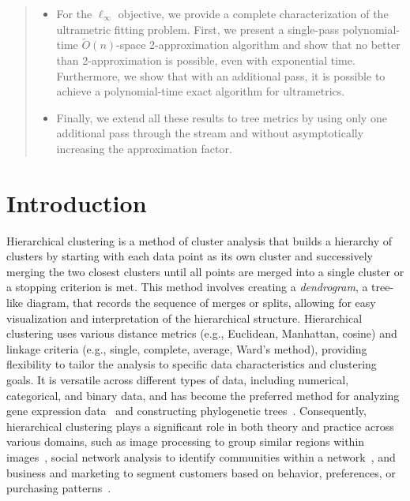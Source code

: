 \documentclass{article}
\begin{document}
\begin{abstract}
\begin{itemize}
    \item For the $\ell_\infty$ objective, we provide a complete characterization of the ultrametric fitting problem. First, we present a single-pass polynomial-time $\tilde{O}(n)$-space 2-approximation algorithm and show that no better than 2-approximation is possible, even with exponential time. Furthermore, we show that with an additional pass, it is possible to achieve a polynomial-time exact algorithm for ultrametrics.
    
    \item Finally, we extend all these results to tree metrics by using only one additional pass through the stream and without asymptotically increasing the approximation factor.

\end{itemize}

\end{abstract}

\newpage {}
\newcommand{\abs}[1]{\left|#1\right|}
\newcommand{\agreements}[1]{A(#1)}
\newcommand{\opttree}{\mathcal{T}_{ALG}}
\newcommand{\close}{\texttt{close}}


\section{Introduction} 
Hierarchical clustering is a method of cluster analysis that builds a hierarchy of clusters by starting with each data point as its own cluster and successively merging the two closest clusters until all points are merged into a single cluster or a stopping criterion is met. This method involves creating a \emph{dendrogram}, a tree-like diagram, that records the sequence of merges or splits, allowing for easy visualization and interpretation of the hierarchical structure. Hierarchical clustering uses various distance metrics (e.g., Euclidean, Manhattan, cosine) and linkage criteria (e.g., single, complete, average, Ward’s method), providing flexibility to tailor the analysis to specific data characteristics and clustering goals. It is versatile across different types of data, including numerical, categorical, and binary data, and has become the preferred method for analyzing gene expression data~\cite{D05} and constructing phylogenetic trees~\cite{charikar, R1}. Consequently, hierarchical clustering plays a significant role in both theory and practice across various domains, such as image processing to group similar regions within images~\cite{1395986}, social network analysis to identify communities within a network~\cite{BREIGER1975328}, and business and marketing to segment customers based on behavior, preferences, or purchasing patterns~\cite{KUMAR2020126}.
\end{document}
